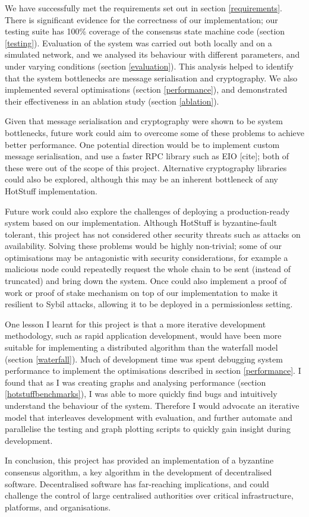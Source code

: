 We have successfully met the requirements set out in section \ref{requirements}. There is significant evidence for the correctness of our implementation; our testing suite has 100\% coverage of the consensus state machine code (section \ref{testing}). Evaluation of the system was carried out both locally and on a simulated network, and we analysed its behaviour with different parameters, and under varying conditions (section \ref{evaluation}). This analysis helped to identify that the system bottlenecks are message serialisation and cryptography. We also implemented several optimisations (section \ref{performance}), and demonstrated their effectiveness in an ablation study (section \ref{ablation}).

Given that message serialisation and cryptography were shown to be system bottlenecks, future work could aim to overcome some of these problems to achieve better performance. One potential direction would be to implement custom message serialisation, and use a faster RPC library such as EIO [cite]; both of these were out of the scope of this project. Alternative cryptography libraries could also be explored, although this may be an inherent bottleneck of any HotStuff implementation.

Future work could also explore the challenges of deploying a production-ready system based on our implementation. Although HotStuff is byzantine-fault tolerant, this project has not considered other security threats such as attacks on availability. Solving these problems would be highly non-trivial; some of our optimisations may be antagonistic with security considerations, for example a malicious node could repeatedly request the whole chain to be sent (instead of truncated) and bring down the system. Once could also implement a proof of work or proof of stake mechanism on top of our implementation to make it resilient to Sybil attacks, allowing it to be deployed in a permissionless setting.

One lesson I learnt for this project is that a more iterative development methodology, such as rapid application development, would have been more suitable for implementing a distributed algorithm than the waterfall model (section \ref{waterfall}). Much of development time was spent debugging system performance to implement the optimisations described in section \ref{performance}. I found that as I was creating graphs and analysing performance (section \ref{hotstuffbenchmarks}), I was able to more quickly find bugs and intuitively understand the behaviour of the system. Therefore I would advocate an iterative model that interleaves development with evaluation, and further automate and parallelise the testing and graph plotting scripts to quickly gain insight during development.

In conclusion, this project has provided an implementation of a byzantine consensus algorithm, a key algorithm in the development of decentralised software. Decentralised software has far-reaching implications, and could challenge the control of large centralised authorities over critical infrastructure, platforms, and organisations.